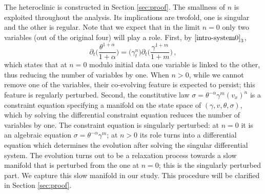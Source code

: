\documentclass[a4paper,11pt]{article}
\theoremstyle{remark}
\begin{document}
The heteroclinic is constructed in Section \ref{sec:proof}.
The smallness of $n$ is exploited throughout the analysis. Its implications are twofold, one is singular and the other is regular. 
Note that we expect that in the limit $n=0$ only two variables (out of the original four) will play a role.
First, by $\eqref{intro-system0}_3$,
$$ \partial_t\Big(\frac{\theta^{1+\alpha}}{1+\alpha}\Big) = \big(\gamma_t^n\big)\partial_t\Big(\frac{\gamma^{1+m}}{1+m}\Big) \, , $$
which  states that at $n=0$ modulo initial data one variable is linked to the other, thus reducing the number of variables by one. When $n>0$, while we cannot remove one of the variables, their co-evolving feature is expected to persist;  this feature is regularly perturbed. 
Second, the constitutive law 
$\sigma=\theta^{-\alpha}\gamma^m(v_x)^n$ is a constraint equation specifying a manifold on the state space of $(\gamma,v,\theta,\sigma)$, which by solving the differential constraint equation reduces the number of variables by one. The constraint equation is singularly perturbed: at $n=0$ it is an algebraic equation $\sigma=\theta^{-\alpha}\gamma^m$;   %
 at $n>0$ its role turns into a differential equation which determines the evolution after solving the singular differential system.
The evolution turns out to be a relaxation process towards a slow manifold that is perturbed from the one at $n=0$; this is the singularly perturbed part. We capture this slow manifold in our study. This procedure will be clarified in Section \ref{sec:proof}.

\end{document}
